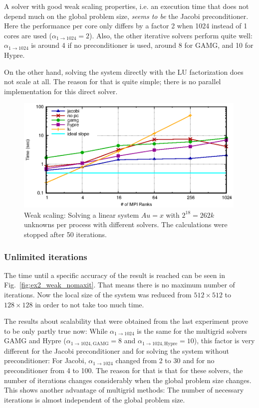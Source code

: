 A solver with good weak scaling properties, i.e. an execution time that does not depend much on the global problem size, \textit{seems to be} the Jacobi preconditioner. Here the performance per core only differs by a factor 2 when 1024 instead of 1 cores are used ($\alpha_{1 \rightarrow 1024} = 2$). Also, the other iterative solvers perform quite well:  $\alpha_{1 \rightarrow 1024}$ is around 4 if no preconditioner is used, around 8 for GAMG, and 10 for Hypre. 

On the other hand, solving the system directly with the LU factorization does not scale at all. The reason for that is quite simple; there is no parallel implementation for this direct solver.

\begin{figure}[tb]
	\centering
	\includegraphics[width=0.99\textwidth]{ex2_weak_time}
	\caption{Weak scaling: Solving a linear system $Au = x$ with $2^{18} = 262k$ unknowns per process with different solvers. The calculations were stopped after 50 iterations.} 
	\label{fig:ex2_weak_time}
\end{figure}

\subsubsection*{Unlimited iterations}
The time until a specific accuracy of the result is reached can be seen in Fig.~\ref{fig:ex2_weak_nomaxit}. That means there is no maximum number of iterations. Now the local size of the system was reduced from $512\times 512$ to $128\times 128$ in order to not take too much time. 

The results about scalability that were obtained from the last experiment prove to be only partly true now: While $\alpha_{1 \rightarrow 1024}$ is the same for the multigrid solvers GAMG and Hypre ($\alpha_{1 \rightarrow 1024, \textrm{GAMG}} =8$ and $\alpha_{1 \rightarrow 1024, \textrm{Hypre}} =10$), this factor is very different for the Jacobi preconditioner and for solving the system without preconditioner: For Jacobi, $\alpha_{1 \rightarrow 1024}$ changed from 2 to 30 and for no preconditioner from 4 to 100. The reason for that is that for these solvers, the number of iterations changes considerably when the global problem size changes. This shows another advantage of multigrid methods: The number of necessary iterations is almost independent of the global problem size.

